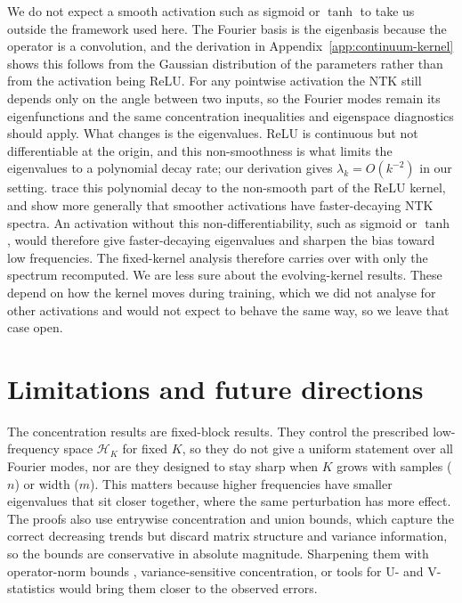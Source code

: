 We do not expect a smooth activation such as sigmoid or \(\tanh\) to take us
outside the framework used here. The Fourier basis is the eigenbasis because the
operator is a convolution, and the derivation in
Appendix~\ref{app:continuum-kernel} shows this follows from the Gaussian
distribution of the parameters rather than from the activation being ReLU. For any
pointwise activation the NTK still depends only on the angle between two inputs, so
the Fourier modes remain its eigenfunctions and the same concentration
inequalities and eigenspace diagnostics should apply. What changes is the
eigenvalues. ReLU is continuous but not differentiable at the origin, and this non-smoothness
is what limits the eigenvalues to a polynomial decay rate; our derivation gives
\(\lambda_k = O(k^{-2})\) in our setting. \citet{bietti2019inductivebiasneuraltangent}
trace this polynomial decay to the non-smooth part of the ReLU kernel, and
\citet{murray2023characterizingspectrumntkpower} show more generally that smoother activations
have faster-decaying NTK spectra. An activation without this non-differentiability,
such as sigmoid or \(\tanh\), would therefore give faster-decaying eigenvalues and
sharpen the bias toward low frequencies. The
fixed-kernel analysis therefore carries over with only the spectrum recomputed.
We are less sure about the evolving-kernel results. These depend on how the kernel
moves during training, which we did not analyse for other activations and would
not expect to behave the same way, so we leave that case open.

\section{Limitations and future directions}
\label{sec:discussion-limitations}

The concentration results are fixed-block results. They control the prescribed
low-frequency space \(\mathcal H_K\) for fixed \(K\), so they do not give a
uniform statement over all Fourier modes, nor are they designed to stay sharp
when \(K\) grows with samples (\(n\)) or width (\(m\)). This matters because higher frequencies have
smaller eigenvalues that sit closer together, where the same perturbation has more
effect. The proofs also use entrywise concentration and union bounds, which
capture the correct decreasing trends but discard matrix structure and variance
information, so the bounds are conservative in absolute magnitude. Sharpening them
with operator-norm bounds \citep[e.g.,][]{tropp2015introduction},
variance-sensitive concentration, or tools for U- and V-statistics
\citep{serfling2009approximation} would bring them closer to the observed errors.

